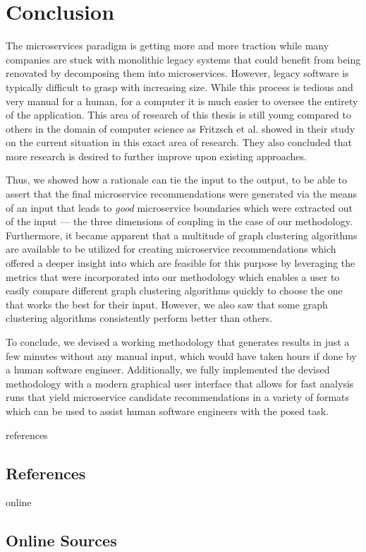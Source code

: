 \documentclass[12pt,a4paper]{report}
\begin{document}
\chapter{Conclusion} \label{chap:conclusion}

The microservices paradigm is getting more and more traction while
many companies are stuck with monolithic legacy systems that could
benefit from being renovated by decomposing them into microservices.
However, legacy software is typically difficult to grasp with increasing size.
While this process is tedious and very manual for a human,
for a computer it is much easier to oversee the entirety of the
application. This area of research of this thesis is still young compared
to others in the domain of computer science as Fritzsch et al. showed in their
study on the current situation in this exact area of research.
They also concluded that more research is desired to further improve
upon existing approaches.

Thus, we showed how a rationale can tie the input to the output,
to be able to assert that the final microservice recommendations
were generated via the means of an input that leads to \textit{good}
microservice boundaries which were extracted out of the input ---
the three dimensions of coupling in the case of our methodology.
Furthermore, it became apparent that a multitude of graph clustering
algorithms are available to be utilized for creating microservice
recommendations which offered a deeper insight into which are
feasible for this purpose by leveraging the metrics that were
incorporated into our methodology which enables a user to easily
compare different graph clustering algorithms quickly to choose the
one that works the best for their input. However, we also saw that
some graph clustering algorithms consistently perform better than others.

To conclude, we devised a working methodology that generates results
in just a few minutes without any manual input,
which would have taken hours if done by a human software engineer.
Additionally, we fully implemented the devised methodology with a
modern graphical user interface that allows for fast analysis runs
that yield microservice candidate recommendations in a variety of formats
which can be used to assist human software engineers with the posed task.




\newpage
{}
\listoffigures
\newpage
{}
\listoftables
\newpage
{}

\begin{btSect}{references}
\section*{\huge{References}}
\btPrintCited
\end{btSect}
\begin{btSect}{online}
\section*{\huge{Online Sources}}
\btPrintCited
\end{btSect}
\end{document}
